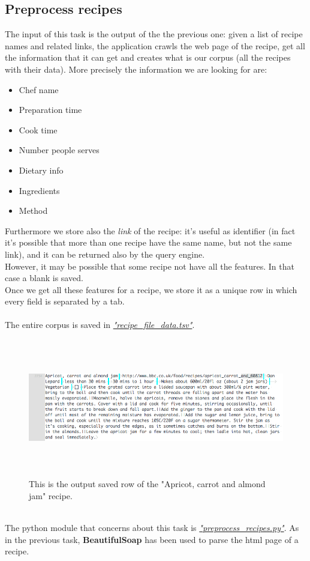\documentclass[oneside]{article}			%
\begin{document}
	\subsection{Preprocess recipes}
	The input of this task is the output of the the previous one: given a list of recipe names and related links, the application crawls the web page of the recipe, get all the information that it can get and creates what is our corpus (all the recipes with their data). More precisely the information we are looking for are:
	\begin{itemize}
		\item Chef name
		\item Preparation time
		\item Cook time
		\item Number people serves
		\item Dietary info
		\item Ingredients
		\item Method
	\end{itemize}
	Furthermore we store also the \textit{link} of the recipe: it's useful as identifier (in fact it's possible that more than one recipe have the same name, but not the same link), and it can be returned also by the query engine.
	\\
	However, it may be possible that some recipe not have all the features. In that case a blank is saved.
	\\
	Once we get all these features for a recipe, we store it as a unique row in which every field is separated by a tab.
	\\\\The entire corpus is saved in \href{run:./report_file/recipe_file_data.tsv}{\textit{"recipe\_file\_data.tsv"}}.
	\begin{figure}[h]
		\includegraphics[width=15cm, height=6cm]{./report_file/img/recipe_file_data.png}\caption{This is the output saved row of the "Apricot, carrot and almond jam" recipe.}
	\end{figure}
	\\
	The python module that concerns about this task is  \href{run:./report_file/src/preprocess\_recipes.py}{\textit{"preprocess\_recipes.py"}}. As in the previous task, \textbf{BeautifulSoap} has been used to parse the html page of a recipe.
\end{document}
